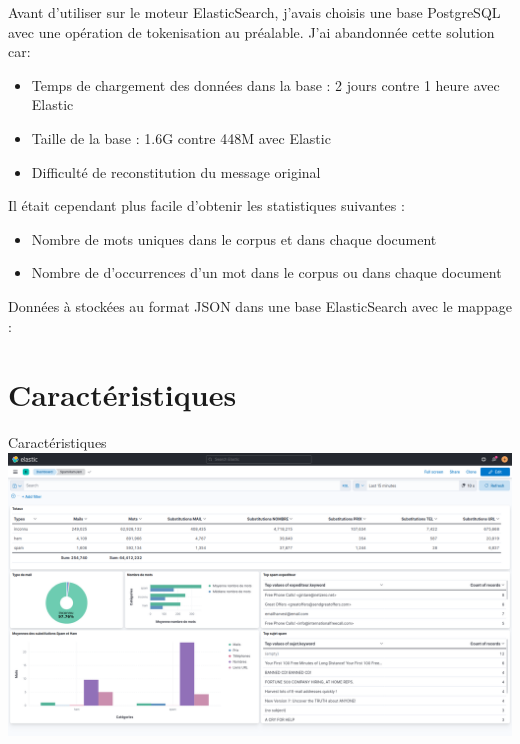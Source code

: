 \documentclass[xelatex,11pt, xcolor=dvipsnames]{beamer}
\begin{document}
\begin{frame}
	Avant d'utiliser sur le moteur ElasticSearch, j'avais choisis une base PostgreSQL avec une opération de tokenisation au préalable. J'ai abandonnée cette solution car:
	\begin{itemize}
		\item Temps de chargement des données dans la base : 2 jours contre 1 heure avec Elastic
		\item Taille de la base : 1.6G contre 448M avec Elastic
		\item Difficulté de reconstitution du message original
	\end{itemize}
	Il était cependant plus facile d'obtenir les statistiques suivantes :
	\begin{itemize}
		\item Nombre de mots uniques dans le corpus et dans chaque document
		\item Nombre de d'occurrences d'un mot dans le corpus ou dans chaque document
	\end{itemize}
\end{frame}


\begin{frame}
	Données à stockées au format JSON dans une base ElasticSearch avec le mappage :
	
\end{frame}


\section{Caractéristiques}

\begin{frame}{Caractéristiques}
	\includegraphics[width=\linewidth]{images/dashboard.png}
\end{frame}
\end{document}
